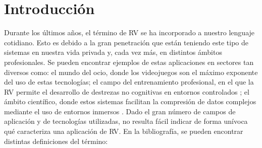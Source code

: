 

\chapter{Introducción} 
\label{cap:intro}



Durante los últimos años, el término de \ac{RV} se ha incorporado a nuestro lenguaje cotidiano. Esto es debido a la gran penetración que están teniendo este tipo de sistemas en nuestra vida privada y, cada vez más, en distintos ámbitos profesionales. Se pueden encontrar ejemplos de estas aplicaciones en sectores tan diversos como: el mundo del ocio, donde los videojuegos son el máximo exponente del uso de estas tecnologías; el campo del entrenamiento profesional, en el que la \ac{RV} permite el desarrollo de destrezas no cognitivas en entornos controlados \cite{PATEL2017266.e7}; el ámbito científico, donde estos sistemas facilitan la compresión de datos complejos mediante el uso de entornos inmersos \cite{usher2018}. Dado el gran número de campos de aplicación y de tecnologías utilizadas, no resulta fácil indicar de forma unívoca qué caracteriza una aplicación de \ac{RV}. En la bibliografía, se pueden encontrar distintas definiciones del término:

